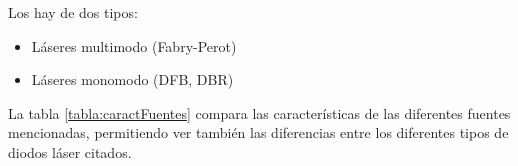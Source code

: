 \begin{itemize}
\begin{itemize}
 				
 			Los hay de dos tipos:	
 			\begin{itemize}
 				\item Láseres multimodo (Fabry-Perot) 
 				\item Láseres monomodo (DFB, DBR)
 			\end{itemize}
 			
 		\end{itemize}
  		
  		La tabla \ref{tabla:caractFuentes} compara las características de las diferentes fuentes mencionadas, permitiendo ver también las diferencias entre los diferentes tipos de diodos láser citados.
  		

\end{itemize}
